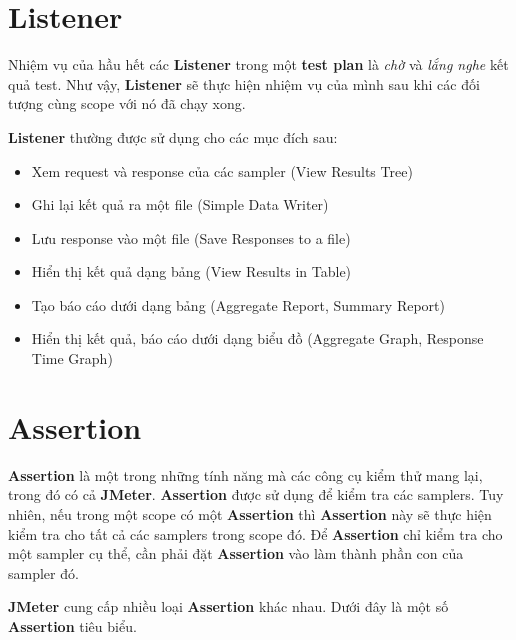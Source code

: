 \documentclass[12pt]{report}
\newcommand{\jmeter}{\textbf{JMeter}}
\begin{document}
\section{Listener}

\par Nhiệm vụ của hầu hết các \textbf{Listener} trong một \textbf{test plan} là \textit{chờ} và \textit{lắng nghe} kết quả test. Như vậy, \textbf{Listener} sẽ thực hiện nhiệm vụ của mình sau khi các đối tượng cùng scope với nó đã chạy xong.

\par \textbf{Listener} thường được sử dụng cho các mục đích sau:

\begin{itemize}
    \item Xem request và response của các sampler (View Results Tree)
    \item Ghi lại kết quả ra một file (Simple Data Writer)
    \item Lưu response vào một file (Save Responses to a file)
    \item Hiển thị kết quả dạng bảng (View Results in Table)
    \item Tạo báo cáo dưới dạng bảng (Aggregate Report, Summary Report)
    \item Hiển thị kết quả, báo cáo dưới dạng biểu đồ (Aggregate Graph, Response Time Graph)
\end{itemize}

\section{Assertion}

\par \textbf{Assertion} là một trong những tính năng mà các công cụ kiểm thử mang lại, trong đó có cả \jmeter{}. \textbf{Assertion} được sử dụng để kiểm tra các samplers. Tuy nhiên, nếu trong một scope có một \textbf{Assertion} thì \textbf{Assertion} này sẽ thực hiện kiểm tra cho tất cả các samplers trong scope đó. Để \textbf{Assertion} chỉ kiểm tra cho một sampler cụ thể, cần phải đặt \textbf{Assertion} vào làm thành phần con của sampler đó.

\par \jmeter{} cung cấp nhiều loại \textbf{Assertion} khác nhau. Dưới đây là một số \textbf{Assertion} tiêu biểu.
\end{document}
